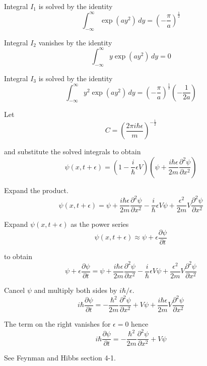 Integral $I_1$ is solved by the identity
\begin{equation*}
\int_{-\infty}^\infty\exp(ay^2)\,dy=\left(-\frac{\pi}{a}\right)^\frac{1}{2}
\end{equation*}

Integral $I_2$ vanishes by the identity
\begin{equation*}
\int_{-\infty}^\infty y\exp(ay^2)\,dy=0
\end{equation*}

Integral $I_3$ is solved by the identity
\begin{equation*}
\int_{-\infty}^\infty y^2\exp(ay^2)\,dy=\left(-\frac{\pi}{a}\right)^\frac{1}{2}\left(-\frac{1}{2a}\right)
\end{equation*}

Let
\begin{equation*}
C=\left(\frac{2\pi i\hbar\epsilon}{m}\right)^{-\frac{1}{2}}
\end{equation*}

and substitute the solved integrals to obtain
\begin{equation*}
\psi(x,t+\epsilon)=\left(1-\frac{i}{\hbar}\epsilon V\right)
\left(\psi+\frac{i\hbar\epsilon}{2m}\frac{\partial^2\psi}{\partial x^2}\right)
\end{equation*}

Expand the product.
\begin{equation*}
\psi(x,t+\epsilon)=\psi
+\frac{i\hbar\epsilon}{2m}\frac{\partial^2\psi}{\partial x^2}
-\frac{i}{\hbar}\epsilon V\psi
+\frac{\epsilon^2}{2m}V\frac{\partial^2\psi}{\partial x^2}
\end{equation*}

Expand $\psi(x,t+\epsilon)$ as the power series
\begin{equation*}
\psi(x,t+\epsilon)\approx\psi+\epsilon\frac{\partial\psi}{\partial t}
\end{equation*}

to obtain
\begin{equation*}
\psi+\epsilon\frac{\partial\psi}{\partial t}
=\psi
+\frac{i\hbar\epsilon}{2m}\frac{\partial^2\psi}{\partial x^2}
-\frac{i}{\hbar}\epsilon V\psi
+\frac{\epsilon^2}{2m}V\frac{\partial^2\psi}{\partial x^2}
\end{equation*}

Cancel $\psi$ and multiply both sides by $i\hbar/\epsilon$.
\begin{equation*}
i\hbar\frac{\partial\psi}{\partial t}
=-\frac{\hbar^2}{2m}\frac{\partial^2\psi}{\partial x^2}+V\psi
+\frac{i\hbar\epsilon}{2m}V\frac{\partial^2\psi}{\partial x^2}
\end{equation*}

The term on the right vanishes for $\epsilon=0$ hence
\begin{equation*}
i\hbar\frac{\partial\psi}{\partial t}
=-\frac{\hbar^2}{2m}\frac{\partial^2\psi}{\partial x^2}+V\psi
\end{equation*}

See Feynman and Hibbs section 4-1.


